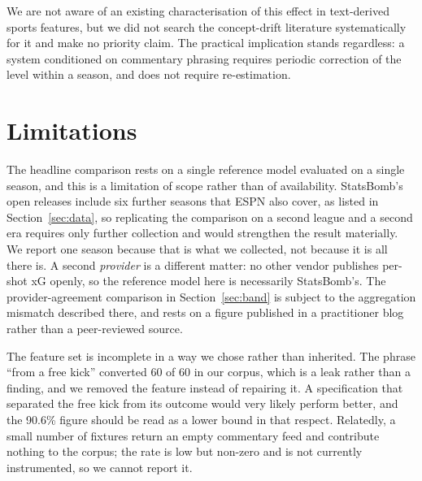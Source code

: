 \documentclass[conference]{IEEEtran}
\begin{document}
We are not aware of an existing characterisation of this effect in
text-derived sports features, but we did not search the concept-drift
literature systematically for it and make no priority claim. The practical
implication stands regardless: a system conditioned on commentary phrasing
requires periodic correction of the level within a season, and does not
require re-estimation.

\section{Limitations}

The headline comparison rests on a single reference model evaluated on a single
season, and this is a limitation of scope rather than of availability.
StatsBomb's open releases include six further seasons that ESPN also cover, as
listed in Section~\ref{sec:data}, so replicating the comparison on a second
league and a second era requires only further collection and would strengthen
the result materially. We report one season because that is what we collected,
not because it is all there is. A second \emph{provider} is a different
matter: no other vendor publishes per-shot xG openly, so the reference model
here is necessarily StatsBomb's. The provider-agreement comparison in
Section~\ref{sec:band} is subject to the aggregation mismatch described
there, and rests on a figure published in a practitioner blog rather than a
peer-reviewed source.

The feature set is incomplete in a way we chose rather than inherited. The
phrase ``from a free kick'' converted 60 of 60 in our corpus, which is a leak
rather than a finding, and we removed the feature instead of repairing it. A
specification that separated the free kick from its outcome would very likely
perform better, and the 90.6\% figure should be read as a lower bound in that
respect. Relatedly, a small number of fixtures return an empty commentary feed
and contribute nothing to the corpus; the rate is low but non-zero and is not
currently instrumented, so we cannot report it.
\end{document}
